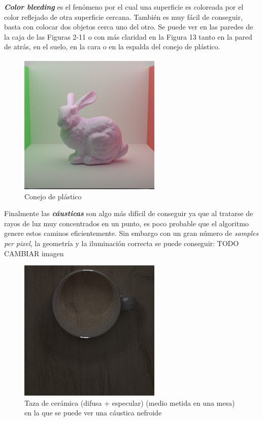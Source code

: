 \documentclass{article}
\begin{document}
\textbf{\textit{Color bleeding}} es el fenómeno por el cual una superficie es
coloreada por el color reflejado de otra superficie cercana. También es muy
fácil de conseguir, basta con colocar dos objetos cerca uno del otro. Se puede
ver en las paredes de la caja de las Figuras 2-11 o con más claridad en la
Figura 13 tanto en la pared de atrás, en el suelo, en la cara o en la espalda
del conejo de plástico. \\

\begin{figure}[H]
\centering
\includegraphics[width=0.6\linewidth]{imgs/plastic_bunny.png}
\caption{Conejo de plástico}
\end{figure}

Finalmente las \textbf{\textit{cáusticas}} son algo más difícil de conseguir ya
que al tratarse de rayos de luz muy concentrados en un punto, es poco probable
que el algoritmo genere estos caminos eficientemente. Sin embargo con un gran
número de \textit{samples per pixel}, la geometría y la iluminación correcta se
puede conseguir: TODO CAMBIAR imagen
\begin{figure}[H]
\centering
\includegraphics[width=0.6\linewidth]{imgs/nephroid.png}
\caption{Taza de cerámica (difusa + especular) (medio metida en una mesa) en la
  que se puede ver una cáustica nefroide}
\end{figure}
\end{document}
